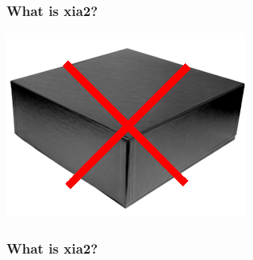 \documentclass[slides,compress]{beamer}
\begin{document}
\begin{frame}
\frametitle{What is xia2?}
\includegraphics[scale=1]{figures/no-blackbox.png}
\end{frame}

\begin{frame}
\frametitle{What is xia2?}
{\large
{}
}
\end{frame}
\end{document}
